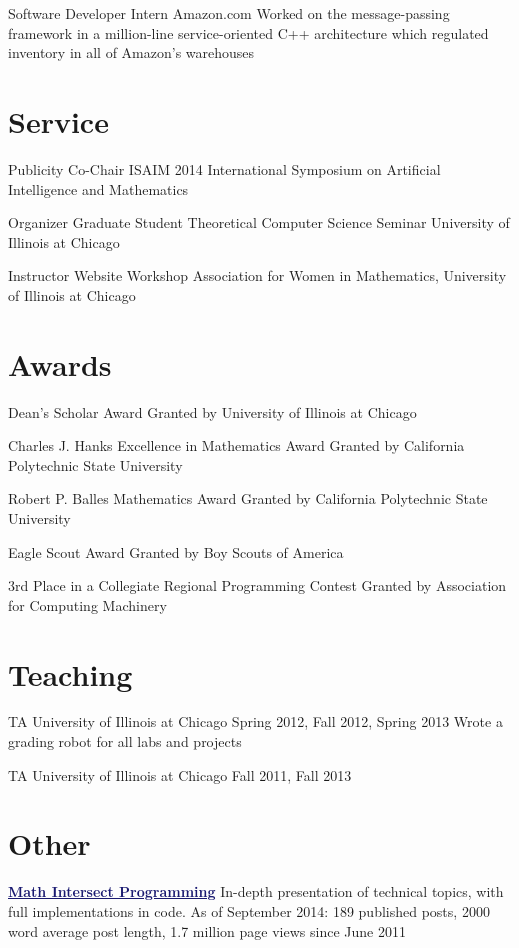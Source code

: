 \documentclass[11pt]{moderncv}
\begin{document}
         {Software Developer Intern}
      {Amazon.com}
      {Worked on the message-passing framework in a million-line service-oriented C++ architecture which regulated inventory in all of Amazon's warehouses}
      {}
      {}


   \section{Service}
         {Publicity Co-Chair}
      {ISAIM 2014}
      {International Symposium on Artificial Intelligence and Mathematics}
      {}
      {}

         {Organizer}
      {Graduate Student Theoretical Computer Science Seminar}
      {University of Illinois at Chicago}
      {}
      {}

         {Instructor}
      {Website Workshop}
      {Association for Women in Mathematics, University of Illinois at Chicago}
      {}
      {}


   \section{Awards}
         {Dean's Scholar Award}
{}
      {Granted by University of Illinois at Chicago}
      {}
      {}

         {Charles J. Hanks Excellence in Mathematics Award}
{}
      {Granted by California Polytechnic State University}
      {}
      {}

         {Robert P. Balles Mathematics Award}
{}
      {Granted by California Polytechnic State University}
      {}
      {}

         {Eagle Scout Award}
{}
      {Granted by Boy Scouts of America}
      {}
      {}

         {3rd Place in a Collegiate Regional Programming Contest}
{}
      {Granted by Association for Computing Machinery}
      {}
      {}


   \section{Teaching}
         {TA}
      {University of Illinois at Chicago}
      {Spring 2012, Fall 2012, Spring 2013}
      {}
      {Wrote a grading robot for all labs and projects}

         {TA}
      {University of Illinois at Chicago}
      {Fall 2011, Fall 2013}
      {}
{}


   \section{Other}
         {\href{http://jeremykun.com}{\textcolor{MidnightBlue}{\underline{\textbf{Math Intersect Programming}}}}}
      {}
      {In-depth presentation of technical topics, with full implementations in code. As of September 2014: 189 published posts, 2000 word average post length, 1.7 million page views since June 2011}
      {}
      {}
\end{document}
